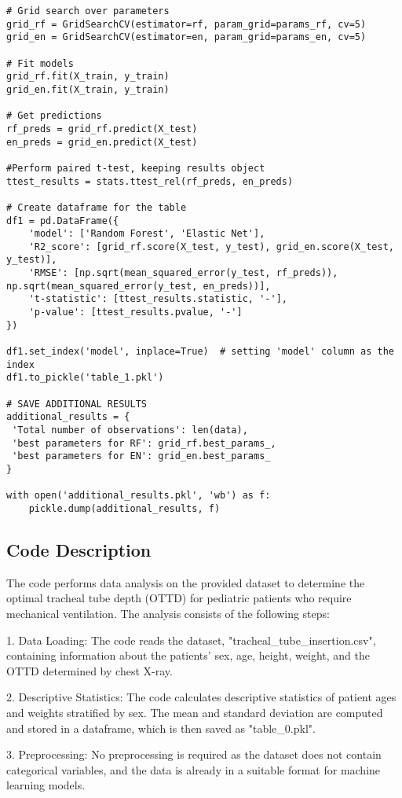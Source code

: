 \documentclass[11pt]{article}
\begin{document}
\begin{verbatim}
# Grid search over parameters
grid_rf = GridSearchCV(estimator=rf, param_grid=params_rf, cv=5)
grid_en = GridSearchCV(estimator=en, param_grid=params_en, cv=5)

# Fit models
grid_rf.fit(X_train, y_train)
grid_en.fit(X_train, y_train)

# Get predictions
rf_preds = grid_rf.predict(X_test)
en_preds = grid_en.predict(X_test)

#Perform paired t-test, keeping results object
ttest_results = stats.ttest_rel(rf_preds, en_preds)

# Create dataframe for the table
df1 = pd.DataFrame({
    'model': ['Random Forest', 'Elastic Net'],
    'R2_score': [grid_rf.score(X_test, y_test), grid_en.score(X_test, y_test)],
    'RMSE': [np.sqrt(mean_squared_error(y_test, rf_preds)), np.sqrt(mean_squared_error(y_test, en_preds))],
    't-statistic': [ttest_results.statistic, '-'],
    'p-value': [ttest_results.pvalue, '-']
})

df1.set_index('model', inplace=True)  # setting 'model' column as the index
df1.to_pickle('table_1.pkl')

# SAVE ADDITIONAL RESULTS
additional_results = {
 'Total number of observations': len(data),
 'best parameters for RF': grid_rf.best_params_,
 'best parameters for EN': grid_en.best_params_
}

with open('additional_results.pkl', 'wb') as f:
    pickle.dump(additional_results, f)

\end{verbatim}

\subsection{Code Description}

The code performs data analysis on the provided dataset to determine the optimal tracheal tube depth (OTTD) for pediatric patients who require mechanical ventilation. The analysis consists of the following steps:

1. Data Loading: The code reads the dataset, "tracheal\_tube\_insertion.csv", containing information about the patients' sex, age, height, weight, and the OTTD determined by chest X-ray.

2. Descriptive Statistics: The code calculates descriptive statistics of patient ages and weights stratified by sex. The mean and standard deviation are computed and stored in a dataframe, which is then saved as "table\_0.pkl".

3. Preprocessing: No preprocessing is required as the dataset does not contain categorical variables, and the data is already in a suitable format for machine learning models.
\end{document}
